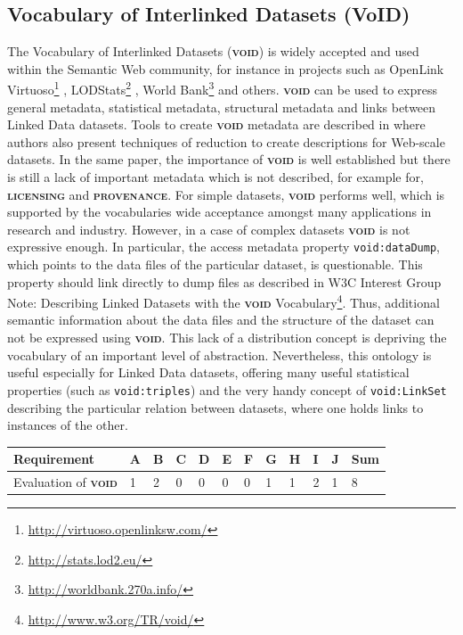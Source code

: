 \documentclass[a4paper,english,twoside,BCOR1.5cm,headsepline,DIV12,appendixprefix,final,12pt]{scrbook}
\newcommand{\provenance}{{\ttfamily\scshape\bfseries provenance}\xspace}
\newcommand{\licensing}{{\ttfamily\scshape\bfseries licensing}\xspace}
\newcommand{\void}{{\scshape\bfseries void}\xspace}
\newcommand{\prop}[1]{{{\texttt{#1}}}}
\newcommand\footnoteurl[1]{\footnote{\scriptsize\url{#1}}}
\begin{document}
\subsection{Vocabulary of Interlinked Datasets (VoID)}
\label{sec:void}

The Vocabulary of Interlinked Datasets (\void) \cite{Alexander09describinglinked} is widely accepted and used within the Semantic Web community, for instance in projects such as OpenLink Virtuoso\footnoteurl{http://virtuoso.openlinksw.com/} , LODStats\footnoteurl{http://stats.lod2.eu/} , World Bank\footnoteurl{http://worldbank.270a.info/} and others. \void can be used to express general metadata, statistical metadata, structural metadata and links between Linked Data datasets. Tools to create \void metadata are described in \cite{DBLP:BohmLN11} where authors also present techniques of reduction to create descriptions for Web-scale datasets. In the same paper, the importance of \void is well established but there is still a lack of important metadata which is not described, for example for, \licensing and \provenance. For simple datasets, \void performs well, which is supported by the vocabularies wide acceptance amongst many applications in research and industry.
However, in a case of complex datasets \void is not expressive enough. In particular, the access metadata property \prop{void:dataDump}, which points to the data files of the particular dataset, is questionable. This property should link directly to dump files as described in W3C Interest Group Note: Describing Linked Datasets with the \void Vocabulary\footnoteurl{http://www.w3.org/TR/void/}. Thus, additional semantic information about the data files and the structure of the dataset can not be expressed using \void. This lack of a distribution concept is depriving the vocabulary of an important level of abstraction. Nevertheless, this ontology is useful especially for Linked Data datasets, offering many useful statistical properties (such as \prop{void:triples}) and the very handy concept of \prop{void:LinkSet} describing the particular relation between datasets, where one holds links to instances of the other.

\begin{table}[!htbp]
    \centering
    \begin{tabular}{|l|l|l|l|l|l|l|l|l|l|l|l|}
        \hline
        Requirement & A & B & C & D & E & F & G & H & I & J & Sum \\
        \hline
        Evaluation of \void & 1 & 2 & 0 & 0 & 0 & 0 & 1 & 1 & 2 & 1 & 8 \\
        \hline
    \end{tabular}
    \label{tab:evalvoid}
\end{table}
\end{document}
